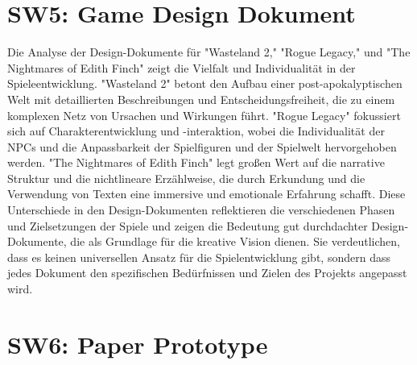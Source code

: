 \documentclass{article}
\begin{document}
\section{SW5: Game Design Dokument}

Die Analyse der Design-Dokumente für "Wasteland 2," "Rogue Legacy," und "The Nightmares of Edith Finch" zeigt die Vielfalt und
Individualität in der Spieleentwicklung. "Wasteland 2" betont den Aufbau einer post-apokalyptischen Welt mit detaillierten
Beschreibungen und Entscheidungsfreiheit, die zu einem komplexen Netz von Ursachen und Wirkungen führt. "Rogue Legacy" fokussiert
sich auf Charakterentwicklung und -interaktion, wobei die Individualität der NPCs und die Anpassbarkeit der Spielfiguren und der
Spielwelt hervorgehoben werden. "The Nightmares of Edith Finch" legt großen Wert auf die narrative Struktur und die nichtlineare
Erzählweise, die durch Erkundung und die Verwendung von Texten eine immersive und emotionale Erfahrung schafft. Diese Unterschiede
in den Design-Dokumenten reflektieren die verschiedenen Phasen und Zielsetzungen der Spiele und zeigen die Bedeutung gut
durchdachter Design-Dokumente, die als Grundlage für die kreative Vision dienen. Sie verdeutlichen, dass es keinen universellen
Ansatz für die Spielentwicklung gibt, sondern dass jedes Dokument den spezifischen Bedürfnissen und Zielen des Projekts angepasst
wird.

\section{SW6: Paper Prototype}
\end{document}
